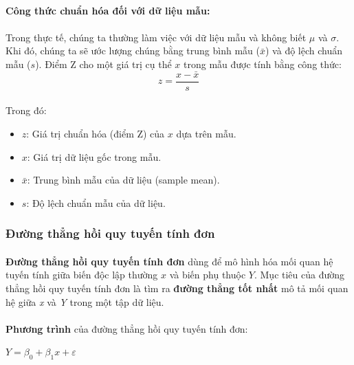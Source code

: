 \paragraph{}{\textbf{Công thức chuẩn hóa đối với dữ liệu mẫu:}}

\paragraph{}{Trong thực tế, chúng ta thường làm việc với dữ liệu mẫu và không biết $\mu$ và $\sigma$. Khi đó, chúng ta sẽ ước lượng chúng bằng trung bình mẫu ($\bar{x}$) và độ lệch chuẩn mẫu ($s$). Điểm Z cho một giá trị cụ thể $x$ trong mẫu được tính bằng công thức:}
\[
z = \frac{x - \bar{x}}{s}
\]
\paragraph{}{Trong đó:}
\begin{itemize}
    \item $z$: Giá trị chuẩn hóa (điểm Z) của $x$ dựa trên mẫu.
    \item $x$: Giá trị dữ liệu gốc trong mẫu.
    \item $\bar{x}$: Trung bình mẫu của  dữ liệu (sample mean).
    \item $s$: Độ lệch chuẩn mẫu của dữ liệu.
\end{itemize}


\subsubsection{Đường thẳng hồi quy tuyến tính đơn} \label{label:simple-linear}

\paragraph{}{\textbf{Đường thẳng hồi quy tuyến tính đơn} dùng để mô hình hóa mối quan hệ tuyến tính giữa biến độc lập thường \( x \) và biến phụ thuộc \( Y \). Mục tiêu của đường thẳng hồi quy tuyến tính đơn là tìm ra \textbf{đường thẳng tốt nhất} mô tả mối quan hệ giữa \textit{x} và \textit{Y} trong một tập dữ liệu.}

\paragraph{}{\textbf{Phương trình} của đường thẳng hồi quy tuyến tính đơn: }



\begin{center}
\large $Y = \beta_0 + \beta_1x + \varepsilon$
\end{center}

